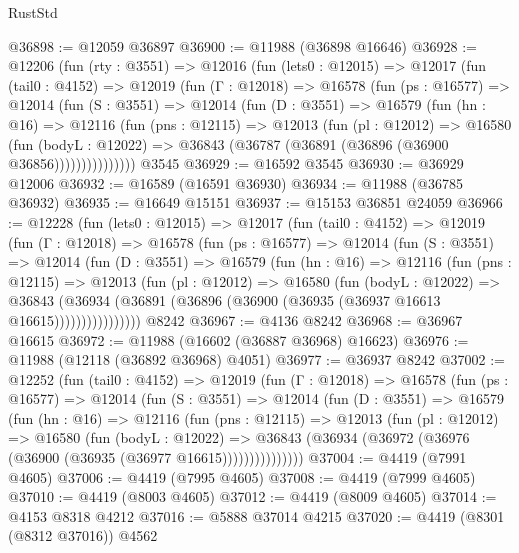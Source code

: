 \begin{lexlean}{RustStd}
\begin{coremodule}
@36898 := @12059 @36897
@36900 := @11988 (@36898 @16646)
@36928 := @12206
    (fun (rty : @3551) =>
    @12016
      (fun (lets0 : @12015) =>
      @12017
        (fun (tail0 : @4152) =>
        @12019
          (fun (Γ : @12018) =>
          @16578
            (fun (ps : @16577) =>
            @12014
              (fun (S : @3551) =>
              @12014
                (fun (D : @3551) =>
                @16579
                  (fun (hn : @16) =>
                  @12116
                    (fun (pns : @12115) =>
                    @12013
                      (fun (pl : @12012) =>
                      @16580
                        (fun (bodyL : @12022) =>
                        @36843 (@36787 (@36891 (@36896 (@36900 @36856)))))))))))))))
    @3545
@36929 := @16592 @3545
@36930 := @36929 @12006
@36932 := @16589 (@16591 @36930)
@36934 := @11988 (@36785 @36932)
@36935 := @16649 @15151
@36937 := @15153 @36851 @24059
@36966 := @12228
    (fun (lets0 : @12015) =>
    @12017
      (fun (tail0 : @4152) =>
      @12019
        (fun (Γ : @12018) =>
        @16578
          (fun (ps : @16577) =>
          @12014
            (fun (S : @3551) =>
            @12014
              (fun (D : @3551) =>
              @16579
                (fun (hn : @16) =>
                @12116
                  (fun (pns : @12115) =>
                  @12013
                    (fun (pl : @12012) =>
                    @16580
                      (fun (bodyL : @12022) =>
                      @36843
                        (@36934
                          (@36891 (@36896 (@36900 (@36935 (@36937 @16613 @16615))))))))))))))))
    @8242
@36967 := @4136 @8242
@36968 := @36967 @16615
@36972 := @11988 (@16602 (@36887 @36968) @16623)
@36976 := @11988 (@12118 (@36892 @36968) @4051)
@36977 := @36937 @8242
@37002 := @12252
    (fun (tail0 : @4152) =>
    @12019
      (fun (Γ : @12018) =>
      @16578
        (fun (ps : @16577) =>
        @12014
          (fun (S : @3551) =>
          @12014
            (fun (D : @3551) =>
            @16579
              (fun (hn : @16) =>
              @12116
                (fun (pns : @12115) =>
                @12013
                  (fun (pl : @12012) =>
                  @16580
                    (fun (bodyL : @12022) =>
                    @36843 (@36934 (@36972 (@36976 (@36900 (@36935 (@36977 @16615)))))))))))))))
@37004 := @4419 (@7991 @4605)
@37006 := @4419 (@7995 @4605)
@37008 := @4419 (@7999 @4605)
@37010 := @4419 (@8003 @4605)
@37012 := @4419 (@8009 @4605)
@37014 := @4153 @8318 @4212
@37016 := @5888 @37014 @4215
@37020 := @4419 (@8301 (@8312 @37016)) @4562

\end{coremodule}
\end{lexlean}
